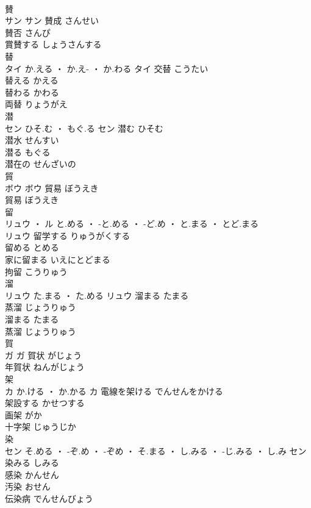 \documentclass[8pt]{extreport}
\begin{document}
\begin{CJK}{UTF8}{min}
\\	賛	
\\	サン		サン	賛成	さんせい	
\\	賛否	さんぴ	
\\	賞賛する	しょうさんする	
\\	替	
\\	タイ	か.える ・ か.え- ・ か.わる	タイ	交替	こうたい	
\\	替える	かえる	
\\	替わる	かわる	
\\	両替	りょうがえ	
\\	潜	
\\	セン	ひそ.む ・ もぐ.る	セン	潜む	ひそむ	
\\	潜水	せんすい	
\\	潜る	もぐる	
\\	潜在の	せんざいの	
\\	貿	
\\	ボウ		ボウ	貿易	ぼうえき	
\\	貿易	ぼうえき	
\\	留	
\\	リュウ ・ ル	と.める ・ -と.める ・ -ど.め ・ と.まる ・ とど.まる
\\	リュウ	留学する	りゅうがくする	
\\	留める	とめる	
\\	家に留まる	いえにとどまる	
\\	拘留	こうりゅう	
\\	溜	
\\	リュウ	た.まる ・ た.める	リュウ	溜まる	たまる	
\\	蒸溜	じょうりゅう	
\\	溜まる	たまる	
\\	蒸溜	じょうりゅう	
\\	賀	
\\	ガ		ガ	賀状	がじょう	
\\	年賀状	ねんがじょう	
\\	架	
\\	カ	か.ける ・ か.かる	カ	電線を架ける	でんせんをかける	
\\	架設する	かせつする	
\\	画架	がか	
\\	十字架	じゅうじか	
\\	染	
\\	セン	そ.める ・ -ぞ.め ・ -ぞめ ・ そ.まる ・ し.みる ・ -じ.みる ・ し.み	セン	染みる	しみる	
\\	感染	かんせん	
\\	汚染	おせん	
\\	伝染病	でんせんびょう	

\end{CJK}
\end{document}
